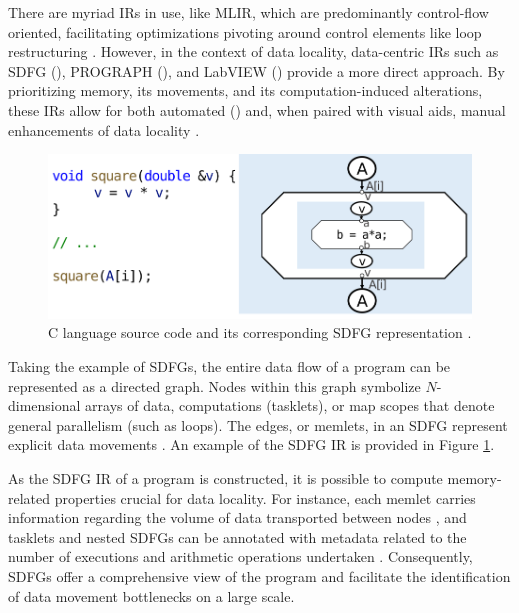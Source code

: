 There are myriad IRs in use, like MLIR, which are predominantly control-flow oriented, facilitating optimizations pivoting around control elements like loop restructuring \cite{moses2021polygeist}. However, in the context of data locality, data-centric IRs such as SDFG (\cite{ben2019statefulSDFG}), PROGRAPH (\cite{matwin1985prograph}), and LabVIEW (\cite{kodosky2020labview}) provide a more direct approach. By prioritizing memory, its movements, and its computation-induced alterations, these IRs allow for both automated (\cite{ben2019statefulSDFG}) and, when paired with visual aids, manual enhancements of data locality \cite{ben2023bridging,ben2019statefulSDFG,schaad2021boosting}.

\begin{figure}
  \centering
  \includegraphics[width=\linewidth]{pictures/SDFG.png}
  \caption{C language source code and its corresponding SDFG representation \cite{calotoiu2022lifting}.}
  \label{fig:sdfg}
\end{figure}

Taking the example of SDFGs, the entire data flow of a program can be represented as a directed graph. Nodes within this graph symbolize $N$-dimensional arrays of data, computations (tasklets), or map scopes that denote general parallelism (such as loops). The edges, or memlets, in an SDFG represent explicit data movements \cite{ben2019statefulSDFG}. An example of the SDFG IR is provided in Figure \ref{fig:sdfg}.

As the SDFG IR of a program is constructed, it is possible to compute memory-related properties crucial for data locality. For instance, each memlet carries information regarding the volume of data transported between nodes \cite{ben2019statefulSDFG}, and tasklets and nested SDFGs can be annotated with metadata related to the number of executions and arithmetic operations undertaken \cite{schaad2021boosting}. Consequently, SDFGs offer a comprehensive view of the program and facilitate the identification of data movement bottlenecks on a large scale.

